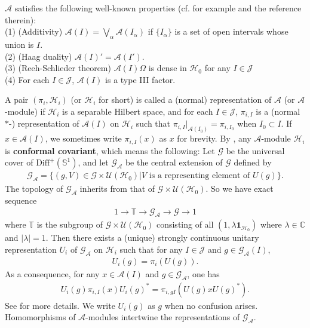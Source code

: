 \documentclass[12pt,a4paper]{article}
\theoremstyle{definition}
\theoremstyle{plain}
\newcommand{\mc}{\mathcal}
\newcommand{\id}{\mathbf{1}}
\newcommand{\Diffp}{\mathrm{Diff}^+}
\newcommand{\GA}{\mathscr G_{\mathcal A}}
\newcommand{\scr}{\mathscr}
\newcommand{\mbb}{\mathbb}
\numberwithin{equation}{subsection}
\begin{document}
$\mathcal A$ satisfies the following well-known properties (cf. for example \cite{GL96} and the reference therein):\\
(1) (Additivity) $\mathcal A(I)=\bigvee_\alpha\mathcal A(I_\alpha)$ if $\{I_\alpha\}$ is a set of open intervals whose union is $I$.\\
(2) (Haag duality) $\mathcal A(I)'=\mathcal A(I')$.\\ 
(3) (Reeh-Schlieder theorem) $\mathcal A(I)\Omega$ is dense in $\mathcal H_0$ for any $I\in\mathcal J$\\
(4) For each $I\in\mathcal J$, $\mathcal A(I)$ is a type III factor.


A pair $(\pi_i,\mc H_i)$ (or $\mc H_i$ for short) is called a (normal) representation of $\mc A$ (or $\mc A$-module) if $\mc H_i$ is a separable Hilbert space, and for each $I\in\mc J$, $\pi_{i,I}$ is a (normal $*$-) representation of $\mc A(I)$ on $\mc H_i$ such that $\pi_{i,I}|_{\mc A(I_0)}=\pi_{i,I_0}$ when $I_0\subset I$. If $x\in\mc A(I)$, we sometimes write $\pi_{i,I}(x)$ as $x$ for brevity. By \cite{Hen19}, any $\mc A$-module $\mc H_i$ is \textbf{conformal covariant}, which means the following: Let $\scr G$ be the universal cover of $\Diffp(\mbb S^1)$, and let $\GA$ be the central extension of $\scr G$ defined by 
\begin{align}
\GA=\{(g,V)\in\mathscr G\times \mathcal U(\mathcal H_0)| V \textrm{ is a representing element of } U(g) \}.\label{eq35}
\end{align}
The topology of $\GA$ inherits from that of $\scr G\times\mc U(\mc H_0)$. So we have exact sequence
\begin{align}
1\rightarrow \mbb T\rightarrow\GA\rightarrow\scr G\rightarrow 1
\end{align}
where $\mbb T$ is the subgroup of $\scr G\times\mc U(\mc H_0)$ consisting of all $(1,\lambda\id_{\mc H_0})$ where $\lambda\in\mbb C$ and $|\lambda|=1$. Then there exists a (unique) strongly continuous unitary representation $U_i$ of $\GA$ on $\mc H_i$ such that for any $I\in\mc J$ and $g\in\GA(I)$,
\begin{align}
U_i(g)=\pi_i(U(g)).\label{eq34}
\end{align}
As a consequence, for any $x\in\mc A(I)$ and $g\in\GA$, one has
\begin{align}
U_i(g)\pi_{i,I}(x)U_i(g)^*=\pi_{i,gI}(U(g)xU(g)^*).
\end{align}
See \cite{Gui21a} for more details. We  write $U_i(g)$ as $g$ when no confusion arises. Homomorphisms of $\mc A$-modules intertwine the representations of $\GA$.
\end{document}
